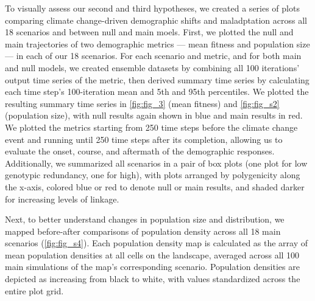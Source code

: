 \documentclass[9pt,twocolumn,twoside,lineno]{pnas-new}
\begin{document}
{To visually assess our second and third hypotheses, we created a series of
plots comparing climate change-driven demographic shifts
and maladptation across all 18 scenarios and between null and main moels.
First, we plotted the 
null and main trajectories of two demographic
metrics --- mean fitness and population size --- in 
each of our 18 scenarios. For each scenario and metric, and 
for both main and null models, we created ensemble datasets by combining all 100 
iterations’ output time series of the metric,
then derived summary time series by calculating each time step's
100-iteration mean and 5th and 95th percentiles.
We plotted the resulting summary time series in \ref{fig:fig_3} (mean fitness)
and \ref{fig:fig_s2} (population size), with null results again shown in blue
and main results in red.
We plotted the metrics starting from 250 time steps before the climate change event
and running until 250 time steps after its completion, allowing us
to evaluate the onset, course, and aftermath of the demographic responses.
Additionally, we summarized all scenarios in a pair of box plots
(one plot for low genotypic redundancy, one for high),
with plots arranged by polygenicity along the x-axis,
colored blue or red to denote null or main results,
and shaded darker for increasing levels of linkage.

Next, to better understand changes in population size and distribution,
we mapped before-after comparisons of population density across all 18
main scenarios (\ref{fig:fig_s4}).
Each population density map is calculated as
the array of mean population densities at all cells on the landscape,
averaged across all 100 main simulations of the map's corresponding scenario.
Population densities are depicted as increasing from black to white, with
values standardized across the entire plot grid.

}
\end{document}

